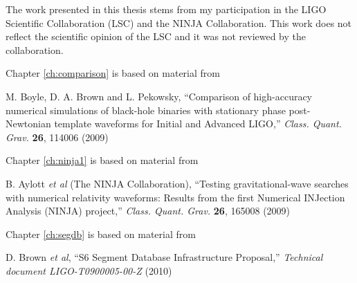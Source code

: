 \documentclass[12pt,notitlepage]{report}
\begin{document}
\iffalse
\havededicationtrue
\dedication{to\\ my parents}
\haveminorfalse
\copyrighttrue
\doctoratetrue
\fi

\pagestyle{syrheadings}
\setcounter{page}{4}
\tableofcontents

\figurespagetrue
\tablespagetrue
\doctoratetrue




\afterpreface
\setcounter{page}{13}
The work presented in this thesis stems from my participation in the
LIGO Scientific Collaboration (LSC) and the NINJA Collaboration.  This
work does not reflect the scientific opinion of the LSC and it was not
reviewed by the collaboration.

\iffalse
\vspace*{0.5cm}

\noindent Chapter \ref{ch:comparison} is based on material from

\vspace*{0.25cm}

\noindent M. Boyle, D. A. Brown and L. Pekowsky, ``Comparison of high-accuracy
numerical simulations of black-hole binaries with stationary phase
post-Newtonian template waveforms for Initial and Advanced LIGO,''
{\it Class. Quant. Grav.} {\bf 26}, 114006 (2009)

\vspace*{0.5cm}

\noindent Chapter \ref{ch:ninja1} is based on material from

\vspace*{0.25cm}

\noindent B. Aylott {\it et al} (The NINJA Collaboration), ``Testing
gravitational-wave searches with numerical relativity waveforms:
Results from the first Numerical INJection Analysis (NINJA) project,''
{\it Class. Quant. Grav.} {\bf 26}, 165008 (2009)


\vspace*{0.5cm}

\noindent Chapter \ref{ch:segdb} is based on material from

\vspace*{0.25cm}

\noindent D. Brown {\it et al}, ``S6 Segment Database
Infrastructure Proposal,'' {\it Technical document
{LIGO}-T0900005-00-Z} (2010)
\end{document}
